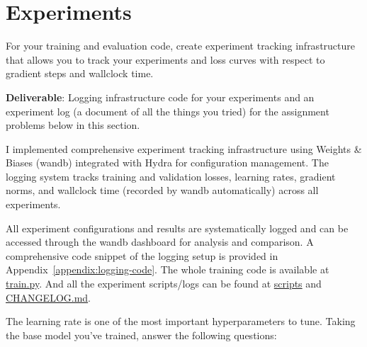 \section{Experiments}


For your training and evaluation code, create experiment tracking infrastructure that allows you to track your experiments and loss curves with respect to gradient steps and wallclock time.

\textbf{Deliverable}: Logging infrastructure code for your experiments and an experiment log (a document of all the things you tried) for the assignment problems below in this section.

\begin{answer}
I implemented comprehensive experiment tracking infrastructure using Weights \& Biases (wandb) integrated with Hydra for configuration management. The logging system tracks training and validation losses, learning rates, gradient norms, and wallclock time (recorded by wandb automatically) across all experiments.

All experiment configurations and results are systematically logged and can be accessed through the wandb dashboard for analysis and comparison. A comprehensive code snippet of the logging setup is provided in Appendix~\ref{appendix:logging-code}. The whole training code is available at \href{https://github.com/donglinkang2021/cs336-assignment1-basics/blob/main/train.py}{train.py}. And all the experiment scripts/logs can be found at \href{https://github.com/donglinkang2021/cs336-assignment1-basics/tree/main/scripts}{scripts} and \href{https://github.com/donglinkang2021/cs336-assignment1-basics/blob/main/docs/CHANGELOG.md}{CHANGELOG.md}.

\end{answer}


The learning rate is one of the most important hyperparameters to tune. Taking the base model you've trained, answer the following questions:

